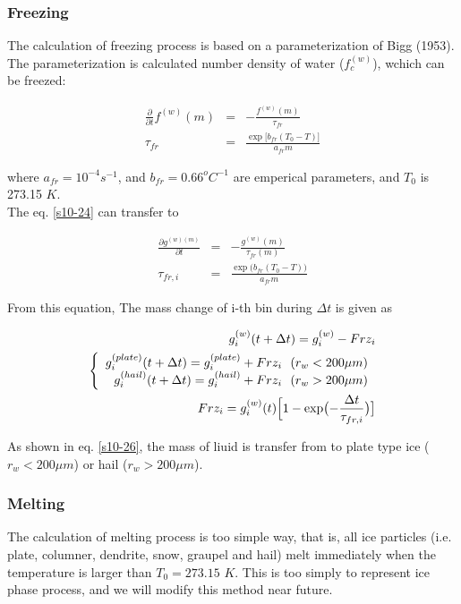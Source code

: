 \subsubsection{Freezing}
The calculation of freezing process is based on a parameterization of Bigg (1953)\cite{bigg_1953}. The parameterization is calculated number density of water ($f_{c}^{(w)}$), wchich can be freezed:

\begin{eqnarray}
\frac{\partial}{\partial t}f^{(w)}(m)&=&-\frac{f^{(w)}(m)}{\tau_{fr}}\label{s10-24}\\
\tau_{fr}&=&\frac{\exp \bigl[b_{fr}(T_{0}-T)\bigr]}{a_{fr} m}\nonumber
\end{eqnarray}

where $a_{fr}=10^{-4}s^{-1}$, and $b_{fr}=0.66^{o}C^{-1}$ are emperical parameters, and $T_{0}$ is 273.15 $K$.\\
The eq. \ref{s10-24} can transfer to

\begin{eqnarray}
\frac{\partial g^{(w)(m)}}{\partial t}&=&-\frac{g^{(w)}(m)}{\tau_{fr}(m)}\\
\tau_{fr,i}&=&\frac{\exp\bigl (b_{fr}(T_{0}-T)\bigr )}{a_{fr}m}\nonumber
\end{eqnarray}

From this equation, The mass change of i-th bin during $\Delta t$ is given as

\begin{eqnarray}
g_{i}^{(w)}(t+\Delta t)=g_{i}^{(w)}-Frz_{i}\\
\left \{
\begin{array}{r}
g_{i}^{(plate)}(t+\Delta t)=g_{i}^{(plate)}+Frz_{i}\:\:\: (r_{w}<200\mu m)\\
g_{i}^{(hail)}(t+\Delta t)=g_{i}^{(hail)}+Frz_{i}\:\:\: (r_{w}>200\mu m)
\end{array} \right.\label{s10-26}\\
Frz_{i}=g_{i}^{(w)}(t)\Bigl [1-\exp\bigl (-\frac{\Delta t}{\tau_{fr,i}}\bigr )\bigr]\nonumber
\end{eqnarray}


 As shown in eq. \ref{s10-26}, the mass of liuid is transfer from to plate type ice ($r_{w}<200\mu m$) or hail ($r_{w}>200\mu m$).

\subsubsection{Melting}
The calculation of melting process is too simple way, that is, all ice particles (i.e. plate, columner, dendrite, snow, graupel and hail) melt immediately when the temperature is larger than $T_{0}=273.15$ $K$. This is too simply to represent ice phase process, and we will modify this method near future.

